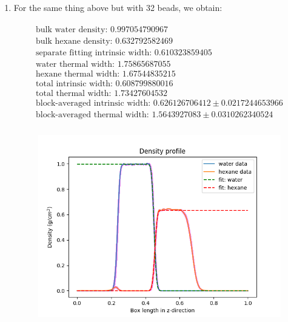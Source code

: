 \documentclass[12pt,reqno]{amsart}
\numberwithin{equation}{section}
\begin{document}
\begin{enumerate}
\item For the same thing above but with 32 beads, we obtain:

\begin{align}
\begin{split}
\text{bulk water density: } 0.997054790967 \\
\text{bulk hexane density: } 0.632792582469 \\
\text{separate fitting intrinsic width: } 0.610323859405 \\
\text{water thermal width: } 1.75865687055 \\
\text{hexane thermal width: } 1.67544835215 \\
\text{total intrinsic width: } 0.608799880016 \\
\text{total thermal width: } 1.73427604532 \\
\text{block-averaged intrinsic width: } 0.626126706412 \pm 0.0217244653966\\
\text{block-averaged thermal width: } 1.5643927083 \pm 0.0310262340524 \\
\end{split}
\end{align} 

\begin{figure}[H]
\centering
\includegraphics[scale=0.6]{interface_density_profile_NVTequil-32bead-long-FULL}
\end{figure}


\end{enumerate}
\end{document}
